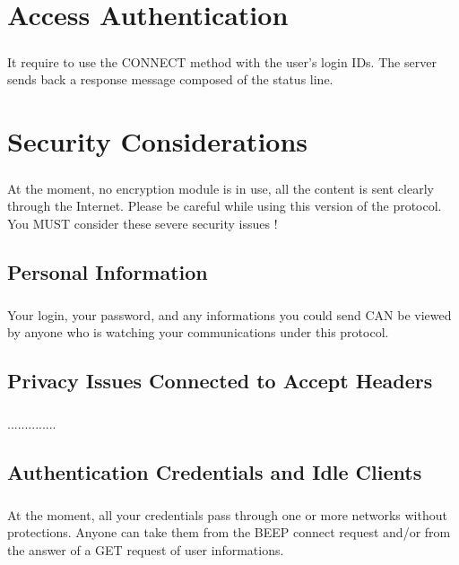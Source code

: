     \clearpage
\chapter{Access Authentication}
        \paragraph{}
It require to use the CONNECT method with the user's login IDs.
The server sends back a response message composed of the status line.


    \clearpage
\chapter{Security Considerations}
        \paragraph{}
At the moment, no encryption module is in use, all the content is
sent clearly through the Internet. Please be careful while using this
version of the protocol. You MUST consider these severe security
issues !
    \section{Personal Information}
        \paragraph{}
Your login, your password, and any informations you could send CAN be
viewed by anyone who is watching your communications under this
protocol.
    \section{Privacy Issues Connected to Accept Headers}
        \paragraph{}
..............
    \section{Authentication Credentials and Idle Clients}
        \paragraph{}
At the moment, all your credentials pass through one or more networks
without protections. Anyone can take them from the BEEP connect
request and/or from the answer of a GET request of user informations.


